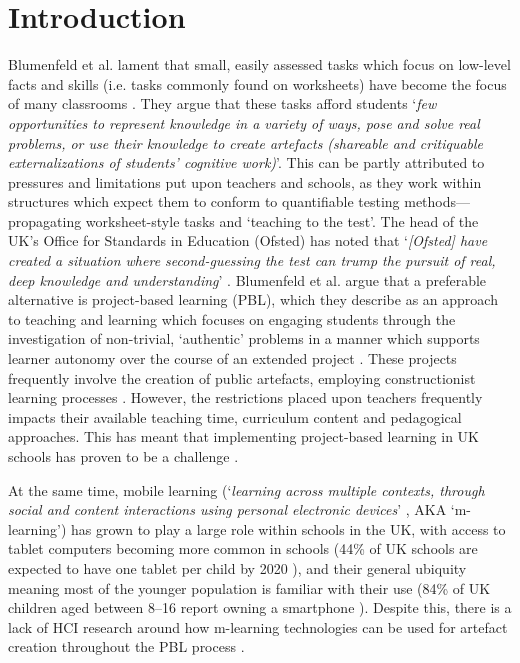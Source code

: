 \documentclass[,hyphens]{sigchi}
\def\plainkeywords{Mobile-Learning; Project-Based Learning; Digital Civics}
\begin{document}

\keywords{\plainkeywords}

\printccsdesc

\section{Introduction}

Blumenfeld et al. lament that small, easily assessed tasks which focus on low-level facts and skills (i.e. tasks commonly found on worksheets) have become the focus of many classrooms \cite{Blumenfeld1991}. They argue that these tasks afford students `\textit{few opportunities to represent knowledge in a variety of ways, pose and solve real problems, or use their knowledge to create artefacts (shareable and critiquable externalizations of students' cognitive work)}'. This can be partly attributed to pressures and limitations put upon teachers and schools, as they work within structures which expect them to conform to quantifiable testing methods---propagating worksheet-style tasks and `teaching to the test'. The head of the UK's Office for Standards in Education (Ofsted) has noted that `\textit{[Ofsted] have created a situation where second-guessing the test can trump the pursuit of real, deep knowledge and understanding}' \cite{Ofsted2018}. Blumenfeld et al. argue that a preferable alternative is project-based learning (PBL), which they describe as an approach to teaching and learning which focuses on engaging students through the investigation of non-trivial, `authentic' problems in a manner which supports learner autonomy over the course of an extended project \cite{Blumenfeld1991}. These projects frequently involve the creation of public artefacts, employing constructionist learning processes \cite{PapertSeymourandHarel1991a, Holubova2008}. However, the restrictions placed upon teachers frequently impacts their available teaching time, curriculum content and pedagogical approaches. This has meant that implementing project-based learning in UK schools has proven to be a challenge \cite{TheEducationEndowmentFoundation2016}.

At the same time, mobile learning (`\textit{learning across multiple contexts, through social and content interactions using personal electronic devices}' \cite{Crompton2013}, AKA `m-learning') has grown to play a large role within schools in the UK, with access to tablet computers becoming more common in schools (44\% of UK schools are expected to have one tablet per child by 2020 \cite{BritishEducationalSuppliersAssociation2015}), and their general ubiquity meaning most of the younger population is familiar with their use (84\% of UK children aged between 8--16 report owning a smartphone \cite{Statistica2018a}). Despite this, there is a lack of HCI research around how m-learning technologies can be used for artefact creation throughout the PBL process \cite{Chan2015}.
\end{document}
